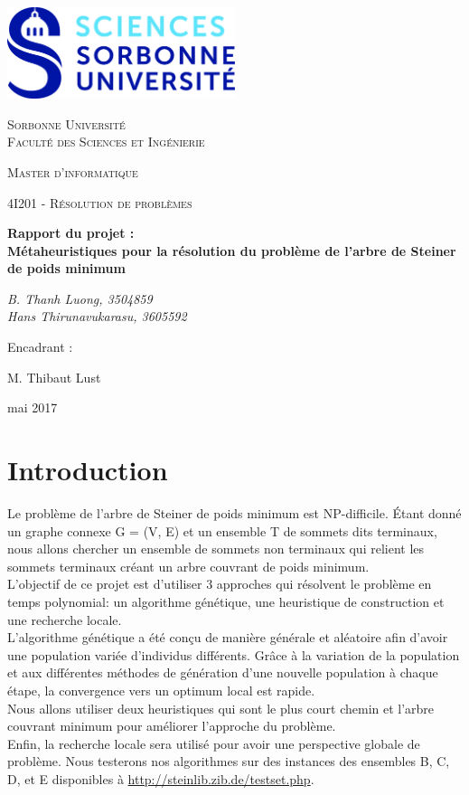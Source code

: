 \documentclass[12pt,a4paper]{article}
\begin{document}
\begin{titlepage}
	\centering
	\includegraphics[width=0.5\textwidth]{SU.jpg}\par\vspace{1cm}
	{\scshape\LARGE Sorbonne Université\\ Faculté des Sciences et Ingénierie \par}
	\vspace{1cm}
	{\scshape\large Master d'informatique \par}
	\vspace{1cm}
	{\scshape\Large 4I201 - Résolution de problèmes\par}
	\vspace{1.5cm}
	{\huge\bfseries Rapport du projet :\\
		Métaheuristiques pour la résolution du
		problème de l’arbre de Steiner de poids minimum\par}
	\vspace{2cm}
	{\Large\itshape B. Thanh Luong, 3504859 \\      Hans Thirunavukarasu, 3605592\par}
	\vfill
	Encadrant :\par
	M. Thibaut Lust
	\vfill

	{\large mai 2017\par}
\end{titlepage}
\newpage
\tableofcontents
\newpage
\section{Introduction}
Le problème de l’arbre de Steiner de poids minimum est NP-difficile. Étant donné un graphe connexe G = (V, E) et un ensemble T de sommets dits terminaux, nous allons chercher un ensemble de sommets non terminaux qui relient les sommets terminaux créant un arbre couvrant de poids minimum.\\
L'objectif de ce projet est d'utiliser 3 approches qui résolvent le problème en temps polynomial: un algorithme génétique, une heuristique de construction et une recherche locale.\\
L'algorithme génétique a été conçu de manière générale et aléatoire afin d'avoir une population variée d'individus différents. Grâce à la variation de la population et 
aux différentes méthodes de génération d'une nouvelle population à chaque étape, la convergence vers un optimum local est rapide.\\
Nous allons utiliser deux heuristiques qui sont le plus court chemin et l'arbre couvrant minimum pour améliorer l'approche du problème.\\
Enfin, la recherche locale sera utilisé pour avoir une perspective globale de problème.
Nous testerons nos algorithmes sur des instances des ensembles B, C, D, et E disponibles à \hyperlink{http://steinlib.zib.de/testset.php}{http://steinlib.zib.de/testset.php}.
\end{document}
